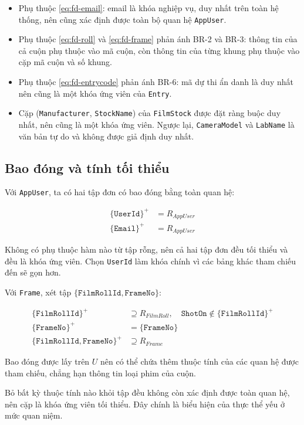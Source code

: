 \begin{itemize}
    \item Phụ thuộc \eqref{eq:fd-email}: email là khóa nghiệp vụ, duy nhất trên toàn hệ thống, nên cũng xác định được toàn bộ quan hệ \texttt{AppUser}.
    \item Phụ thuộc \eqref{eq:fd-roll} và \eqref{eq:fd-frame} phản ánh BR-2 và BR-3: thông tin của cả cuộn phụ thuộc vào mã cuộn, còn thông tin của từng khung phụ thuộc vào cặp mã cuộn và số khung.
    \item Phụ thuộc \eqref{eq:fd-entrycode} phản ánh BR-6: mã dự thi ẩn danh là duy nhất nên cũng là một khóa ứng viên của \texttt{Entry}.
    \item Cặp (\texttt{Manufacturer}, \texttt{StockName}) của \texttt{FilmStock} được đặt ràng buộc duy nhất, nên cũng là một khóa ứng viên. Ngược lại, \texttt{CameraModel} và \texttt{LabName} là văn bản tự do và không được giả định duy nhất.
\end{itemize}

\subsection{Bao đóng và tính tối thiểu}

Với \texttt{AppUser}, ta có hai tập đơn có bao đóng bằng toàn quan hệ:

{\small\begin{align*}
\{\texttt{UserId}\}^{+} &= R_{AppUser} \\
\{\texttt{Email}\}^{+} &= R_{AppUser}
\end{align*}}

Không có phụ thuộc hàm nào từ tập rỗng, nên cả hai tập đơn đều tối thiểu và đều là khóa ứng viên. Chọn \texttt{UserId} làm khóa chính vì các bảng khác tham chiếu đến sẽ gọn hơn.

Với \texttt{Frame}, xét tập $\{\texttt{FilmRollId}, \texttt{FrameNo}\}$:

{\small\begin{align*}
\{\texttt{FilmRollId}\}^{+} &\supseteq R_{FilmRoll}, \quad \texttt{ShotOn} \notin \{\texttt{FilmRollId}\}^{+} \\
\{\texttt{FrameNo}\}^{+} &= \{\texttt{FrameNo}\} \\
\{\texttt{FilmRollId}, \texttt{FrameNo}\}^{+} &\supseteq R_{Frame}
\end{align*}}

Bao đóng được lấy trên $U$ nên có thể chứa thêm thuộc tính của các quan hệ được tham chiếu, chẳng hạn thông tin loại phim của cuộn.

Bỏ bất kỳ thuộc tính nào khỏi tập đều không còn xác định được toàn quan hệ, nên cặp là khóa ứng viên tối thiểu. Đây chính là biểu hiện của thực thể yếu ở mức quan niệm.

